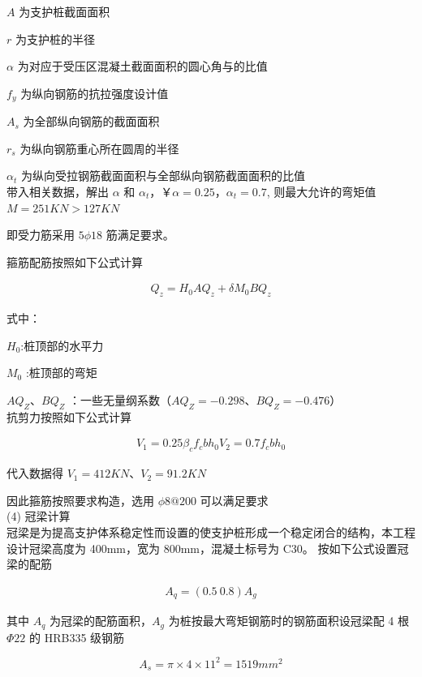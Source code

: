 $A$ 为支护桩截面面积

$r$ 为支护桩的半径

$\alpha $ 为对应于受压区混凝土截面面积的圆心角与的比值

$f_y$ 为纵向钢筋的抗拉强度设计值

$A_s$ 为全部纵向钢筋的截面面积

$r_s$ 为纵向钢筋重心所在圆周的半径

$\alpha_t$ 为纵向受拉钢筋截面面积与全部纵向钢筋截面面积的比值\\

带入相关数据，解出 $\alpha \text{ 和 } \alpha_t$，￥$\alpha=0.25$，$\alpha_t=0.7$,
则最大允许的弯矩值 $M=251 KN > 127 KN$

即受力筋采用 $5\phi 18$ 筋满足要求。

箍筋配筋按照如下公式计算

\begin{align}
    \label{fx:6.8}
    Q_z=H_0AQ_z+\delta M_0BQ_z
\end{align}

式中：

$H_0$:桩顶部的水平力

$M_0$ :桩顶部的弯矩

$AQ_Z$、$BQ_Z$ ：一些无量纲系数（$AQ_Z=-0.298$、$BQ_Z=-0.476$）\\

抗剪力按照如下公式计算

\begin{align}
    \label{fx:6.8}
    V_1=0.25 \beta_cf_cbh_0
    V_2=0.7 f_cbh_0
\end{align}

代入数据得 $V_1=412KN$、$V_2=91.2KN$

因此箍筋按照要求构造，选用 $\phi8@200$ 可以满足要求\\

(4) 冠梁计算\\

冠梁是为提高支护体系稳定性而设置的使支护桩形成一个稳定闭合的结构，本工程设计冠梁高度为 400mm，宽为 800mm，混凝土标号为 C30。
按如下公式设置冠梁的配筋

\begin{align}
    \label{fx:6.9}
    A_q=(0.5~0.8)A_g
\end{align}

其中 $A_q$ 为冠梁的配筋面积，$A_g$ 为桩按最大弯矩钢筋时的钢筋面积设冠梁配 4 根 $\Phi22$ 的 HRB335 级钢筋

\[A_s=\pi \times 4\times 11^2=1519 mm^2\]

